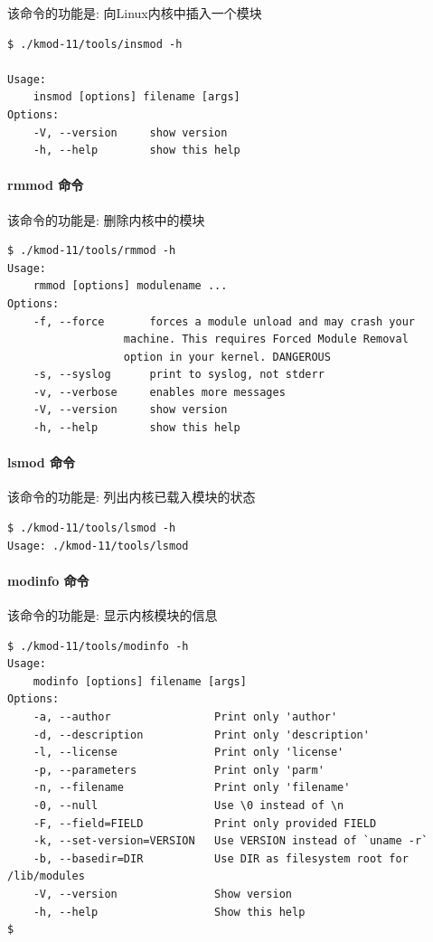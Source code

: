\documentclass[11pt,a4paper]{article}
\begin{document}
该命令的功能是: 向Linux内核中插入一个模块

{\begin{shaded}\begin{verbatim}
$ ./kmod-11/tools/insmod -h

Usage:
    insmod [options] filename [args]
Options:
    -V, --version     show version
    -h, --help        show this help
\end{verbatim}\end{shaded}}
\paragraph{rmmod 命令}

该命令的功能是: 删除内核中的模块

{\begin{shaded}\begin{verbatim}
$ ./kmod-11/tools/rmmod -h
Usage:
    rmmod [options] modulename ...
Options:
    -f, --force       forces a module unload and may crash your
                  machine. This requires Forced Module Removal
                  option in your kernel. DANGEROUS
    -s, --syslog      print to syslog, not stderr
    -v, --verbose     enables more messages
    -V, --version     show version
    -h, --help        show this help
\end{verbatim}\end{shaded}}
\paragraph{lsmod 命令}

该命令的功能是: 列出内核已载入模块的状态

{\begin{shaded}\begin{verbatim}
$ ./kmod-11/tools/lsmod -h
Usage: ./kmod-11/tools/lsmod
\end{verbatim}\end{shaded}}
\paragraph{modinfo 命令}

该命令的功能是: 显示内核模块的信息

{\begin{shaded}\begin{verbatim}
$ ./kmod-11/tools/modinfo -h
Usage:
    modinfo [options] filename [args]
Options:
    -a, --author                Print only 'author'
    -d, --description           Print only 'description'
    -l, --license               Print only 'license'
    -p, --parameters            Print only 'parm'
    -n, --filename              Print only 'filename'
    -0, --null                  Use \0 instead of \n
    -F, --field=FIELD           Print only provided FIELD
    -k, --set-version=VERSION   Use VERSION instead of `uname -r`
    -b, --basedir=DIR           Use DIR as filesystem root for /lib/modules
    -V, --version               Show version
    -h, --help                  Show this help
$ 
\end{verbatim}\end{shaded}}
\end{document}
